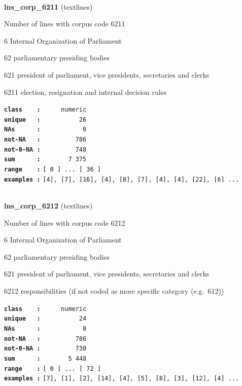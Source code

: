 \documentclass[]{article}
\begin{document}
~

\textbf{lns\_corp\_6211} (textlines)

Number of lines with corpus code 6211

6 Internal Organization of Parliament

62 parliamentary presiding bodies

621 president of parliament, vice presidents, secretaries and clerks

6211 election, resignation and internal decision rules

\textbf{\texttt{class\ \ \ \ :}} \texttt{~~~~~numeric}\\
\textbf{\texttt{unique\ \ \ :}} \texttt{~~~~~~~~~~26}\\
\textbf{\texttt{NAs\ \ \ \ \ \ :}} \texttt{~~~~~~~~~~~0}\\
\textbf{\texttt{not-NA\ \ \ :}} \texttt{~~~~~~~~~786}\\
\textbf{\texttt{not-0-NA\ :}} \texttt{~~~~~~~~~748}\\
\textbf{\texttt{sum\ \ \ \ \ \ :}} \texttt{~~~~~~~7~375}\\
\textbf{\texttt{range\ \ \ \ :}}
\texttt{{[}\ 0\ {]}\ ...\ {[}\ 36\ {]}}\\
\textbf{\texttt{examples\ :}}
\texttt{{[}4{]},\ {[}7{]},\ {[}16{]},\ {[}4{]},\ {[}8{]},\ {[}7{]},\ {[}4{]},\ {[}4{]},\ {[}22{]},\ {[}6{]}\ ...}\\

~

\textbf{lns\_corp\_6212} (textlines)

Number of lines with corpus code 6212

6 Internal Organization of Parliament

62 parliamentary presiding bodies

621 president of parliament, vice presidents, secretaries and clerks

6212 responsibilities (if not coded as more specific category
(e.g.~612))

\textbf{\texttt{class\ \ \ \ :}} \texttt{~~~~~numeric}\\
\textbf{\texttt{unique\ \ \ :}} \texttt{~~~~~~~~~~24}\\
\textbf{\texttt{NAs\ \ \ \ \ \ :}} \texttt{~~~~~~~~~~~0}\\
\textbf{\texttt{not-NA\ \ \ :}} \texttt{~~~~~~~~~786}\\
\textbf{\texttt{not-0-NA\ :}} \texttt{~~~~~~~~~730}\\
\textbf{\texttt{sum\ \ \ \ \ \ :}} \texttt{~~~~~~~5~448}\\
\textbf{\texttt{range\ \ \ \ :}}
\texttt{{[}\ 0\ {]}\ ...\ {[}\ 72\ {]}}\\
\textbf{\texttt{examples\ :}}
\texttt{{[}7{]},\ {[}1{]},\ {[}2{]},\ {[}14{]},\ {[}4{]},\ {[}5{]},\ {[}8{]},\ {[}3{]},\ {[}12{]},\ {[}4{]}\ ...}\\
\end{document}
